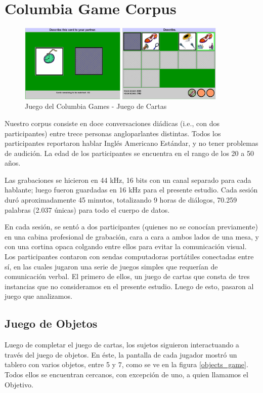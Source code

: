 \section{Columbia Game Corpus}

\begin{figure}[t]
\centering
\includegraphics[width=10cm]{images/columbia_games_card_game.png}
\caption{Juego del Columbia Games - Juego de Cartas}
\end{figure}


\newcommand{\cardgame} {\emph{Juego de cartas}}
\newcommand{\objectgame} {\emph{Juego de objetos}}


Nuestro corpus \cite{GRAV2009} consiste en doce conversaciones diádicas (i.e., con dos participantes) entre trece personas angloparlantes distintas. Todos los participantes reportaron hablar Inglés Americano Estándar, y no tener problemas de audición. La edad de los participantes se encuentra en el rango de los 20 a 50 años.

Las grabaciones se hicieron en 44 kHz, 16 bits con un canal separado para cada hablante; luego fueron guardadas en 16 kHz para el presente estudio. Cada sesión duró aproximadamente 45 minutos, totalizando 9 horas de
diálogos, 70.259 palabras (2.037 únicas) para todo el cuerpo de datos.

En cada sesión, se sentó a dos participantes (quienes no se conocían previamente) en una cabina profesional de grabación, cara a cara a ambos lados de una mesa, y con una cortina opaca colgando entre ellos para evitar la comunicación visual. Los participantes contaron con sendas computadoras portátiles conectadas entre sí, en las cuales jugaron una serie de juegos simples que requerían de comunicación verbal. El primero de ellos, un juego de cartas que consta de tres instancias que no consideramos en el presente estudio. Luego de esto, pasaron al juego que analizamos.

\subsection{Juego de Objetos}

Luego de completar el juego de cartas, los sujetos siguieron interactuando a través del juego de objetos. En éste, la pantalla de cada jugador mostró un tablero con varios objetos, entre 5 y 7, como se ve en la figura \ref{objects_game}. Todos ellos se encuentran cercanos, con excepción de uno, a quien llamamos el Objetivo.

